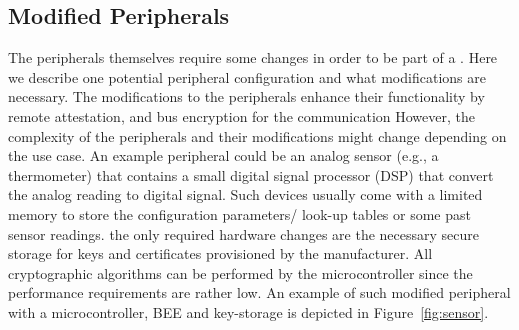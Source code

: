  \subsection{Modified Peripherals}


 The peripherals themselves require some changes in order to be part of a \nameenclave. Here we describe one potential peripheral configuration and what modifications are necessary. The modifications to the peripherals enhance their functionality by remote attestation, and bus encryption for the communication However, the complexity of the peripherals and their modifications might change depending on the use case. An example peripheral could be an analog sensor (e.g., a thermometer) that contains a small digital signal processor (DSP) that convert the analog reading to digital signal.  Such devices usually come with a limited memory to store the configuration parameters/ look-up tables or some past sensor readings. the only required hardware changes are the necessary secure storage for keys and certificates provisioned by the manufacturer. All cryptographic algorithms can be performed by the microcontroller since the performance requirements are rather low. An example of such modified peripheral with a microcontroller, BEE and key-storage is depicted in Figure~\ref{fig:sensor}.